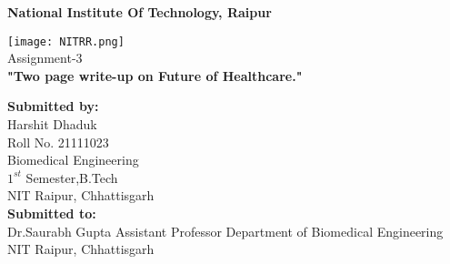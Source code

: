 \documentclass[12pt]{article}
\begin{document}
\pagestyle{empty}



   \begin{center}
       \vspace{1cm}
	   \Large
       \textbf{National Institute Of Technology, Raipur } 
       \vspace{1.5cm}
     
       \texttt{[image: NITRR.png]}\\
       \vspace{0.8cm}
       \Huge
       Assignment-3\\
       \vspace{0.8cm}
      \textbf{ "Two page write-up on Future of Healthcare."}
      
	\vfill      
      
   \begin{multicols}{2} 
   \begin{flushleft}
       \large
       \textbf{Submitted by:}\\
       Harshit Dhaduk\\
       Roll No. 21111023\\
       Biomedical Engineering\\
       $1^{st}$ Semester,B.Tech\\
       NIT Raipur, Chhattisgarh\\
       
       \textbf{Submitted to:}\\
       Dr.Saurabh Gupta
       Assistant Professor
       Department of Biomedical Engineering\\
       NIT Raipur, Chhattisgarh
    \end{flushleft}
    \end{multicols}
            
   \end{center}

 


\clearpage
\pagestyle{fancy}
\tableofcontents
\clearpage
\end{document}
